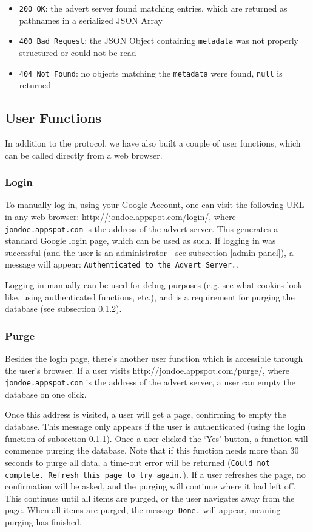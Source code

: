 \begin{itemize}
  \item \texttt{200 OK}: the advert server found matching entries, which are
  returned as pathnames in a serialized JSON Array
  \item \texttt{400 Bad Request}: the JSON Object containing \texttt{metadata}
  was not properly structured or could not be read
  \item \texttt{404 Not Found}: no objects matching the \texttt{metadata} were
  found, \texttt{null} is returned
\end{itemize}

\subsection{User Functions}
In addition to the protocol, we have also built a couple of user functions,
which can be called directly from a web browser.

\subsubsection{Login}
\label{login}
To manually log in, using your Google Account, one can visit the following URL
in any web browser: \url{http://jondoe.appspot.com/login/}, where
\texttt{jondoe.appspot.com} is the address of the advert server. This generates
a standard Google login page, which can be used as such. If logging in was
successful (and the user is an administrator - see subsection \ref{admin-panel}),
a message will appear: \texttt{Authenticated to the Advert Server.}.

Logging in manually can be used for debug purposes (e.g. see what cookies look
like, using authenticated functions, etc.), and is a requirement for purging
the database (see subsection \ref{purge}).

\subsubsection{Purge}
\label{purge}
Besides the login page, there's another user function which is accessible
through the user's browser. If a user visits
\url{http://jondoe.appspot.com/purge/}, where \texttt{jondoe.appspot.com} is the
address of the advert server, a user can empty the database on one click. 

Once this address is visited, a user will get a page, confirming to empty the
database. This message only appears if the user is authenticated (using the
login function of subsection \ref{login}). Once a user clicked the `Yes'-button, a
function will commence purging the database. Note that if this function needs
more than 30 seconds to purge all data, a time-out error will be returned
(\texttt{Could not complete. Refresh this page to try again.}). If a user
refreshes the page, no confirmation will be asked, and the purging will
continue where it had left off. This continues until all items are purged, or
the user navigates away from the page. When all items are purged, the message 
\texttt{Done.} will appear, meaning purging has finished.

